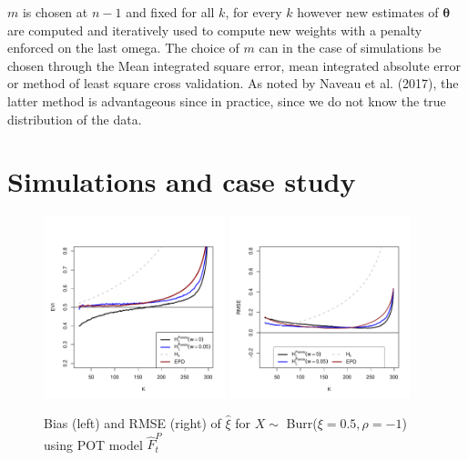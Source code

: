 \documentclass[a4paper,11pt]{article}
\begin{document}
$m$ is chosen at $n-1$ and fixed for all $k$, for every $k$ however new estimates of $\boldsymbol{\theta}$ are computed and iteratively used to compute new weights with a penalty enforced on the last omega.
The choice of $m$ can in the case of simulations be chosen through the Mean integrated square error, mean integrated absolute error or method of least square cross validation. As noted by Naveau et al. (2017), the latter method is advantageous since in practice, since we do not know the true distribution of the data.
 
 \section{Simulations and case study}
 
 \begin{figure}[!ht]
  \centering
 \includegraphics[width=0.47\textwidth]{EP_burr_xi_m24.pdf}
 \includegraphics[width=0.47\textwidth]{EP_burr_rmse_m24.pdf}        
 \caption{\small Bias (left) and RMSE (right) of $\hat{\xi}$ for $X \sim$ Burr($\xi=0.5, \rho=-1$) using POT model $\hat{F}^{P}_t$} 
\end{figure}
\end{document}
